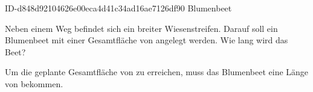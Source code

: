 \begin{exercise}
      {ID-d848d92104626e00eca4d41c34ad16ae7126df90}
      {Blumenbeet}
  \ifproblem\problem\par
    Neben einem Weg befindet sich ein  breiter Wiesenstreifen. Darauf
    soll ein Blumenbeet mit einer Gesamtfläche von  angelegt werden.
    Wie lang wird das Beet?
  \fi
  \ifoutcome\outcome\par
    Um die geplante Gesamtfläche von  zu erreichen, muss
    das Blumenbeet eine Länge von  bekommen.
  \fi
\end{exercise}
